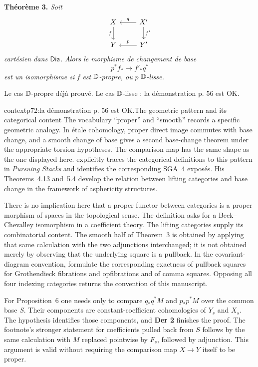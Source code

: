 \noindent\textbf{Théorème 3.} \textit{Soit}
\[
\begin{tikzcd}
X \arrow[d, "f"{swap}] & X' \arrow[l, "q"{swap}] \arrow[d, "f'"] \\
Y & Y' \arrow[l, "p"{swap}]
\end{tikzcd}
\]
\textit{cartésien dans} $\mathsf{Dia}$. \textit{Alors le morphisme de changement de base}
\[
p^*f_* \longrightarrow f'_*q^*
\]
\textit{est un isomorphisme si} $f$ \textit{est} $\mathbb{D}$\textit{-propre, ou} $p$ $\mathbb{D}$\textit{-lisse.}

\noindent Le cas $\mathbb{D}$-propre déjà prouvé. Le cas $\mathbb{D}$-lisse : la démonstration p. 56 est OK.

\begin{dcomment}{context}{p72:la démonstration p. 56 est OK.}{The geometric pattern and its categorical content}
The vocabulary ``proper'' and ``smooth'' records a specific geometric analogy. In étale cohomology, proper direct image commutes with base change, and a smooth change of base gives a second base-change theorem under the appropriate torsion hypotheses. The comparison map has the same shape as the one displayed here. \citet[Introduction and Theorem~1.2]{Maltsiniotis2005Asphericite} explicitly traces the categorical definitions to this pattern in \emph{Pursuing Stacks} and identifies the corresponding SGA~4 exposés. His Theorems~4.13 and~5.4 develop the relation between lifting categories and base change in the framework of asphericity structures.

There is no implication here that a proper functor between categories is a proper morphism of spaces in the topological sense. The definition asks for a Beck--Chevalley isomorphism in a coefficient theory. The lifting categories supply its combinatorial content. The smooth half of Theorem~3 is obtained by applying that same calculation with the two adjunctions interchanged; it is not obtained merely by observing that the underlying square is a pullback. In the covariant-diagram convention, \citet[Propositions~1.24 and~1.26]{Groth2013} formulate the corresponding exactness of pullback squares for Grothendieck fibrations and opfibrations and of comma squares. Opposing all four indexing categories returns the convention of this manuscript.

For Proposition~6 one needs only to compare $q_*q^*M$ and $p_*p^*M$ over the common base $S$. Their components are constant-coefficient cohomologies of $Y_s$ and $X_s$. The hypothesis identifies those components, and \textbf{Der 2} finishes the proof. The footnote's stronger statement for coefficients pulled back from $S$ follows by the same calculation with $M$ replaced pointwise by $F_s$, followed by adjunction. This argument is valid without requiring the comparison map $X\to Y$ itself to be proper.
\end{dcomment}


